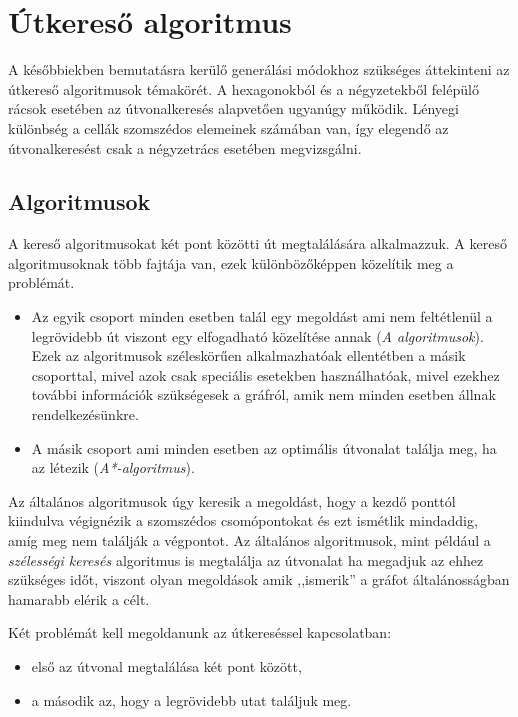 \chapter{Útkereső algoritmus}

A későbbiekben bemutatásra kerülő generálási módokhoz szükséges áttekinteni az útkereső algoritmusok témakörét. A hexagonokból és a négyzetekből felépülő rácsok esetében az útvonalkeresés alapvetően ugyanúgy működik. Lényegi különbség a cellák szomszédos elemeinek számában van, így elegendő az útvonalkeresést csak a négyzetrács esetében megvizsgálni.

\section{Algoritmusok}

A kereső algoritmusokat két pont közötti út megtalálására alkalmazzuk. 
A kereső algoritmusoknak több fajtája van, ezek különbözőképpen közelítik meg a problémát. 
\begin{itemize}
\item Az egyik csoport minden esetben talál egy megoldást ami nem feltétlenül a legrövidebb út viszont egy elfogadható közelítése annak (\textit{A algoritmusok}). Ezek az algoritmusok széleskörűen alkalmazhatóak ellentétben a másik csoporttal, mivel azok csak speciális esetekben használhatóak, mivel ezekhez további információk szükségesek a gráfról, amik nem minden esetben állnak rendelkezésünkre.
\item A másik csoport ami minden esetben az optimális útvonalat találja meg, ha az létezik (\textit{A*-algoritmus}).
\end{itemize}

Az általános algoritmusok úgy keresik a megoldást, hogy a kezdő ponttól kiindulva végignézik a szomszédos csomópontokat és ezt ismétlik mindaddig, amíg meg nem találják a végpontot. Az általános algoritmusok, mint például a \textit{szélességi keresés} algoritmus is megtalálja az útvonalat ha megadjuk az ehhez szükséges időt, viszont olyan megoldások amik ,,ismerik'' a gráfot általánosságban hamarabb elérik a célt.

Két problémát kell megoldanunk az útkereséssel kapcsolatban: 
\begin{itemize}
\item első az útvonal megtalálása két pont között, 
\item a második az, hogy a legrövidebb utat találjuk meg. 
\end{itemize}


